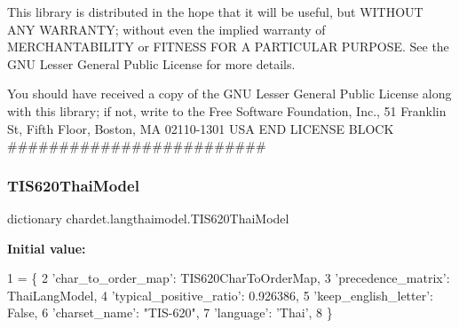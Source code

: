 This library is distributed in the hope that it will be useful, but W\+I\+T\+H\+O\+UT A\+NY W\+A\+R\+R\+A\+N\+TY; without even the implied warranty of M\+E\+R\+C\+H\+A\+N\+T\+A\+B\+I\+L\+I\+TY or F\+I\+T\+N\+E\+SS F\+OR A P\+A\+R\+T\+I\+C\+U\+L\+AR P\+U\+R\+P\+O\+SE. See the G\+NU Lesser General Public License for more details.

You should have received a copy of the G\+NU Lesser General Public License along with this library; if not, write to the Free Software Foundation, Inc., 51 Franklin St, Fifth Floor, Boston, MA 02110-\/1301 U\+SA E\+ND L\+I\+C\+E\+N\+SE B\+L\+O\+CK \#\#\#\#\#\#\#\#\#\#\#\#\#\#\#\#\#\#\#\#\#\#\#\#\# \mbox{\label{namespacechardet_1_1langthaimodel_addc8ec9bc9cfa137a2b86d286cdf1589}} 
\subsubsection{\texorpdfstring{T\+I\+S620\+Thai\+Model}{TIS620ThaiModel}}
{\footnotesize\ttfamily dictionary chardet.\+langthaimodel.\+T\+I\+S620\+Thai\+Model}

{\bfseries Initial value\+:}
\begin{DoxyCode}
1 =  \{
2   \textcolor{stringliteral}{'char\_to\_order\_map'}: TIS620CharToOrderMap,
3   \textcolor{stringliteral}{'precedence\_matrix'}: ThaiLangModel,
4   \textcolor{stringliteral}{'typical\_positive\_ratio'}: 0.926386,
5   \textcolor{stringliteral}{'keep\_english\_letter'}: \textcolor{keyword}{False},
6   \textcolor{stringliteral}{'charset\_name'}: \textcolor{stringliteral}{"TIS-620"},
7   \textcolor{stringliteral}{'language'}: \textcolor{stringliteral}{'Thai'},
8 \}
\end{DoxyCode}
